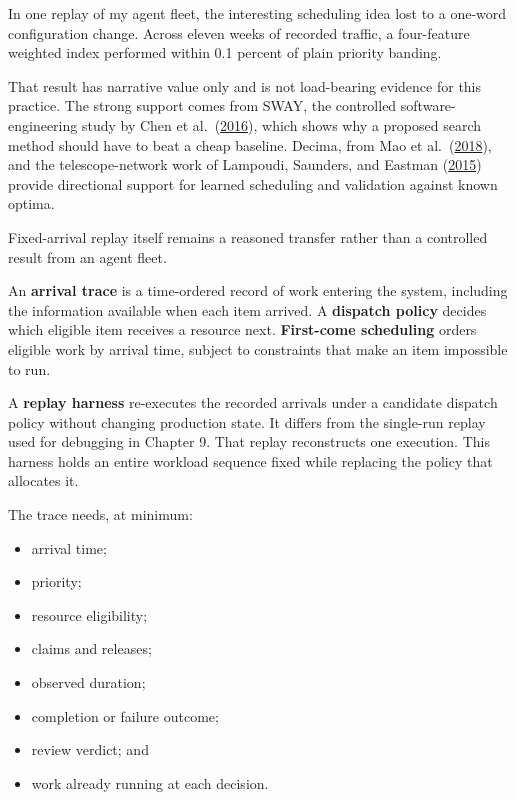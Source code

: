 In one replay of my agent fleet, the interesting scheduling idea lost to a one-word configuration change. Across eleven weeks of recorded traffic, a four-feature weighted index performed within 0.1 percent of plain priority banding.

That result has narrative value only and is not load-bearing evidence for this practice. The strong support comes from SWAY, the controlled software-engineering study by Chen et al.~(\href{https://arxiv.org/abs/1608.07617}{2016}), which shows why a proposed search method should have to beat a cheap baseline. Decima, from Mao et al.~(\href{https://arxiv.org/abs/1810.01963}{2018}), and the telescope-network work of Lampoudi, Saunders, and Eastman (\href{https://arxiv.org/abs/1503.07170}{2015}) provide directional support for learned scheduling and validation against known optima.

Fixed-arrival replay itself remains a reasoned transfer rather than a controlled result from an agent fleet.

An \textbf{arrival trace} is a time-ordered record of work entering the system, including the information available when each item arrived. A \textbf{dispatch policy} decides which eligible item receives a resource next. \textbf{First-come scheduling} orders eligible work by arrival time, subject to constraints that make an item impossible to run.

A \textbf{replay harness} re-executes the recorded arrivals under a candidate dispatch policy without changing production state. It differs from the single-run replay used for debugging in Chapter 9. That replay reconstructs one execution. This harness holds an entire workload sequence fixed while replacing the policy that allocates it.

The trace needs, at minimum:

\begin{itemize}
\tightlist
\item
  arrival time;
\item
  priority;
\item
  resource eligibility;
\item
  claims and releases;
\item
  observed duration;
\item
  completion or failure outcome;
\item
  review verdict; and
\item
  work already running at each decision.
\end{itemize}

